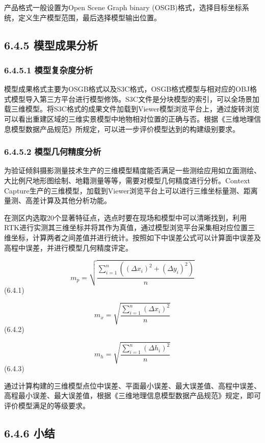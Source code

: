 产品格式一般设置为Open Scene Graph binary
(OSGB)格式，选择目标坐标系统，定义生产模型范围，最后选择模型输出位置。

\subsection{6.4.5
模型成果分析}\label{ux6a21ux578bux6210ux679cux5206ux6790}

\subsubsection{6.4.5.1
模型复杂度分析}\label{ux6a21ux578bux590dux6742ux5ea6ux5206ux6790}

模型成果格式主要为OSGB格式以及S3C格式，OSGB格式模型与相对应的OBJ格式模型导入第三方平台进行模型修饰。S3C文件是分块模型的索引，可以全场景加载三维模型。将S3C格式的成果文件加载到Viewer模型浏览平台上，通过旋转浏览可以看出重建区域的三维实景模型中地物相对位置的正确与否。根据《三维地理信息模型数据产品规范》所规定，可以进一步评价模型达到的构建级别要求。

\subsubsection{6.4.5.2
模型几何精度分析}\label{ux6a21ux578bux51e0ux4f55ux7cbeux5ea6ux5206ux6790}

为验证倾斜摄影测量技术生产的三维模型精度能否满足一些测绘应用如立面测绘、大比例尺地形图绘制、地籍测量等等，需要对模型几何精度进行分析。Context
Capture生产的三维模型，加载到Viewer浏览平台上可以进行三维坐标量测、距离量测、高差计算及其他分析功能。

在测区内选取20个显著特征点，选点时要在现场和模型中可以清晰找到，利用RTK进行实测其三维坐标并将其作为真值，通过模型浏览平台采集相对应位置三维坐标，计算两者之间差值并进行统计。按照如下中误差公式可以计算面中误差及高程中误差，并进行模型几何精度评定。

\[m_p = \sqrt{\frac{\sum_{i=1}^{n}((\Delta x_i)^2 + (\Delta y_i)^2)}{n}}\]
(6.4.1)

\[m_x = \sqrt{\frac{\sum_{i=1}^{n}(\Delta x_i)^2}{n}}\] (6.4.2)

\[m_h = \sqrt{\frac{\sum_{i=1}^{n}(\Delta h_i)^2}{n}}\] (6.4.3)

通过计算构建的三维模型点位中误差、平面最小误差、最大误差值、高程中误差、高程最小误差、最大误差值，根据《三维地理信息模型数据产品规范》规定，即可评价模型满足的等级要求。

\subsection{6.4.6 小结}\label{ux5c0fux7ed3}

